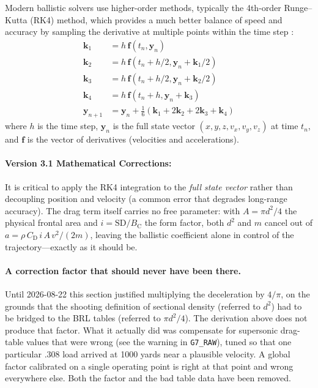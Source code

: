 \documentclass[11pt,twoside,openright]{report}
\newcommand{\Cd}{C_{\mathrm{D}}}
\newcommand{\Bc}{B_{\mathrm{C}}}
\begin{document}
Modern ballistic solvers use higher-order methods, typically the 4th-order Runge--Kutta (RK4) method, which provides a much better balance of speed and accuracy by sampling the derivative at multiple points within the time step \citep[p.~443]{kutta1901beitrag}:
\begin{align}
  \bm{k}_1 &= h\,\bm{f}(t_n, \bm{y}_n) \\
  \bm{k}_2 &= h\,\bm{f}(t_n + h/2, \bm{y}_n + \bm{k}_1/2) \\
  \bm{k}_3 &= h\,\bm{f}(t_n + h/2, \bm{y}_n + \bm{k}_2/2) \\
  \bm{k}_4 &= h\,\bm{f}(t_n + h, \bm{y}_n + \bm{k}_3) \\
  \bm{y}_{n+1} &= \bm{y}_n + \tfrac{1}{6}(\bm{k}_1 + 2\bm{k}_2 + 2\bm{k}_3 + \bm{k}_4)
  \label{eq:rk4}
\end{align}
where $h$ is the time step, $\bm{y}_n$ is the full state vector $(x, y, z, v_x, v_y, v_z)$ at time $t_n$, and $\bm{f}$ is the vector of derivatives (velocities and accelerations).

\paragraph{Version 3.1 Mathematical Corrections:} 
It is critical to apply the RK4 integration to the \emph{full state vector} rather
than decoupling position and velocity (a common error that degrades long-range
accuracy). The drag term itself carries no free parameter: with $A = \pi d^2/4$ the
physical frontal area and $i = \mathrm{SD}/\Bc$ the form factor, both $d^2$ and $m$
cancel out of $a = \rho\,\Cd\,i\,A\,v^2/(2m)$, leaving the ballistic coefficient alone
in control of the trajectory---exactly as it should be.

\paragraph{A correction factor that should never have been there.} Until 2026-08-22
this section justified multiplying the deceleration by $4/\pi$, on the grounds that
the shooting definition of sectional density (referred to $d^2$) had to be bridged to
the BRL tables (referred to $\pi d^2/4$). The derivation above does not produce that
factor. What it actually did was compensate for supersonic drag-table values that were
wrong (see the warning in \texttt{G7\_RAW}), tuned so that one particular .308 load
arrived at 1000 yards near a plausible velocity. A global factor calibrated on a single
operating point is right at that point and wrong everywhere else. Both the factor and
the bad table data have been removed.
\end{document}
